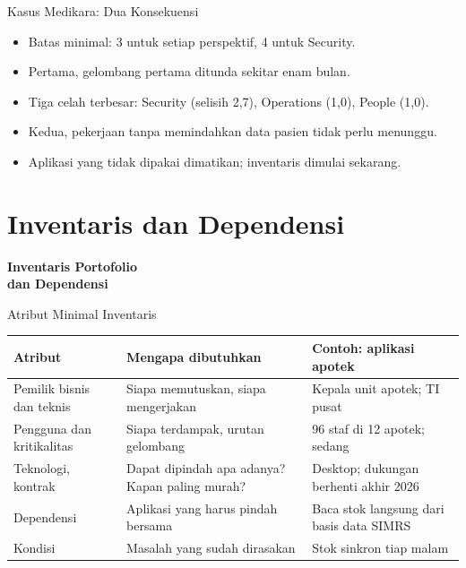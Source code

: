 \documentclass[aspectratio=169, table, 12pt]{beamer}
\begin{document}
\begin{frame}{Kasus Medikara: Dua Konsekuensi}
  \begin{itemize}
    \item Batas minimal: 3 untuk setiap perspektif, 4 untuk Security.
    \item Pertama, gelombang pertama ditunda sekitar enam bulan.
    \item Tiga celah terbesar: Security (selisih 2,7), Operations (1,0), People (1,0).
    \item Kedua, pekerjaan tanpa memindahkan data pasien tidak perlu menunggu.
    \item Aplikasi yang tidak dipakai dimatikan; inventaris dimulai sekarang.
  \end{itemize}
\end{frame}

\section{Inventaris dan Dependensi}

\begin{frame}{\hfill}
  \centering
  \Huge{\textbf{Inventaris Portofolio\\dan Dependensi}}
\end{frame}

\begin{frame}{Atribut Minimal Inventaris}
  \footnotesize
  \begin{tabularx}{\textwidth}{>{\raggedright\arraybackslash}p{3cm}YY}
    \hline
    \textbf{Atribut} & \textbf{Mengapa dibutuhkan} & \textbf{Contoh: aplikasi apotek} \\
    \hline
    Pemilik bisnis dan teknis & Siapa memutuskan, siapa mengerjakan & Kepala unit apotek;
      TI pusat \\
    \hline
    Pengguna dan kritikalitas & Siapa terdampak, urutan gelombang & 96 staf di 12
      apotek; sedang \\
    \hline
    Teknologi, kontrak & Dapat dipindah apa adanya? Kapan paling murah? & Desktop;
      dukungan berhenti akhir 2026 \\
    \hline
    Dependensi & Aplikasi yang harus pindah bersama & Baca stok langsung dari basis data
      SIMRS \\
    \hline
    Kondisi & Masalah yang sudah dirasakan & Stok sinkron tiap malam \\
    \hline
  \end{tabularx}
\end{frame}
\end{document}
